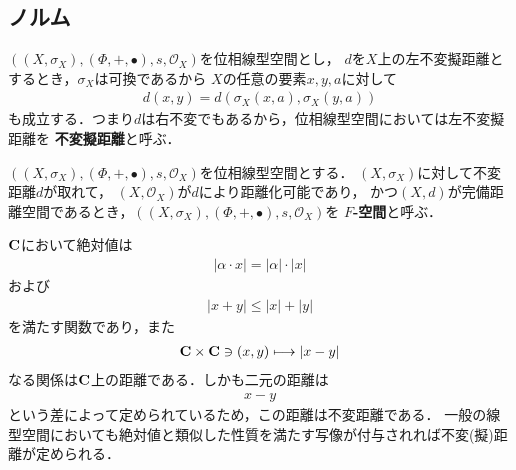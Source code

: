 \subsection{ノルム}
	$\left(\left(X,\sigma_X\right),(\Phi,+,\bullet),s,\mathscr{O}_X\right)$を位相線型空間とし，
	$d$を$X$上の左不変擬距離とするとき，$\sigma_X$は可換であるから
	$X$の任意の要素$x,y,a$に対して
	\begin{align}
		d\left(x,y\right) = d\left(\sigma_X\left(x,a\right),\sigma_X\left(y,a\right)\right)
	\end{align}
	も成立する．つまり$d$は右不変でもあるから，位相線型空間においては左不変擬距離を
	{\bf 不変擬距離}と呼ぶ．
	
	\begin{screen}
		\begin{dfn}[$F$-空間]
			$\left(\left(X,\sigma_X\right),(\Phi,+,\bullet),s,\mathscr{O}_X\right)$を位相線型空間とする．
			$\left(X,\sigma_X\right)$に対して不変距離$d$が取れて，
			$\left(X,\mathscr{O}_X\right)$が$d$により距離化可能であり，
			かつ$(X,d)$が完備距離空間であるとき，$\left(\left(X,\sigma_X\right),(\Phi,+,\bullet),s,\mathscr{O}_X\right)$を
			{\bf $F$-空間}と呼ぶ．
		\end{dfn}
	\end{screen}
	
	$\mathbf{C}$において絶対値は
	\begin{align}
		|\alpha \cdot x| = |\alpha| \cdot |x|
	\end{align}
	および
	\begin{align}
		|x + y| \leq |x| + |y|
	\end{align}
	を満たす関数であり，また
	\begin{align}
		\mathbf{C} \times \mathbf{C} \ni (x,y) \longmapsto |x - y|
	\end{align}
	なる関係は$\mathbf{C}$上の距離である．しかも二元の距離は
	\begin{align}
		x - y
	\end{align}
	という差によって定められているため，この距離は不変距離である．
	一般の線型空間においても絶対値と類似した性質を満たす写像が付与されれば不変(擬)距離が定められる．
	
